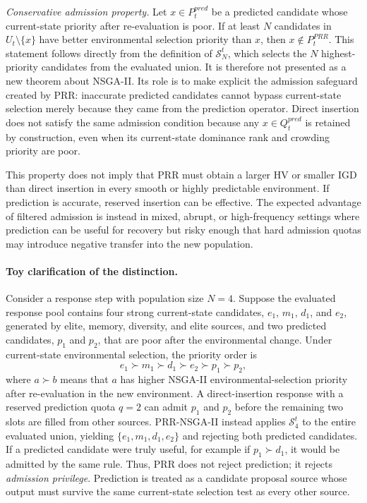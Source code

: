 \documentclass[1p,times]{elsarticle}
\begin{document}
\textit{Conservative admission property.} Let $x\in P^{pred}_t$ be a predicted candidate whose current-state priority after re-evaluation is poor. If at least $N$ candidates in $U_t\setminus\{x\}$ have better environmental selection priority than $x$, then $x\notin P^{PRR}_t$. This statement follows directly from the definition of $\mathcal{S}^{t}_{N}$, which selects the $N$ highest-priority candidates from the evaluated union. It is therefore not presented as a new theorem about NSGA-II. Its role is to make explicit the admission safeguard created by PRR: inaccurate predicted candidates cannot bypass current-state selection merely because they came from the prediction operator. Direct insertion does not satisfy the same admission condition because any $x\in Q^{pred}_t$ is retained by construction, even when its current-state dominance rank and crowding priority are poor.

This property does not imply that PRR must obtain a larger HV or smaller IGD than direct insertion in every smooth or highly predictable environment. If prediction is accurate, reserved insertion can be effective. The expected advantage of filtered admission is instead in mixed, abrupt, or high-frequency settings where prediction can be useful for recovery but risky enough that hard admission quotas may introduce negative transfer into the new population.

\paragraph{Toy clarification of the distinction.}
Consider a response step with population size $N=4$. Suppose the evaluated response pool contains four strong current-state candidates, $e_1$, $m_1$, $d_1$, and $e_2$, generated by elite, memory, diversity, and elite sources, and two predicted candidates, $p_1$ and $p_2$, that are poor after the environmental change. Under current-state environmental selection, the priority order is
\[
 e_1 \succ m_1 \succ d_1 \succ e_2 \succ p_1 \succ p_2,
\]
where $a\succ b$ means that $a$ has higher NSGA-II environmental-selection priority after re-evaluation in the new environment. A direct-insertion response with a reserved prediction quota $q=2$ can admit $p_1$ and $p_2$ before the remaining two slots are filled from other sources. PRR-NSGA-II instead applies $\mathcal{S}^{t}_{4}$ to the entire evaluated union, yielding $\{e_1,m_1,d_1,e_2\}$ and rejecting both predicted candidates. If a predicted candidate were truly useful, for example if $p_1\succ d_1$, it would be admitted by the same rule. Thus, PRR does not reject prediction; it rejects \emph{admission privilege}. Prediction is treated as a candidate proposal source whose output must survive the same current-state selection test as every other source.
\end{document}

